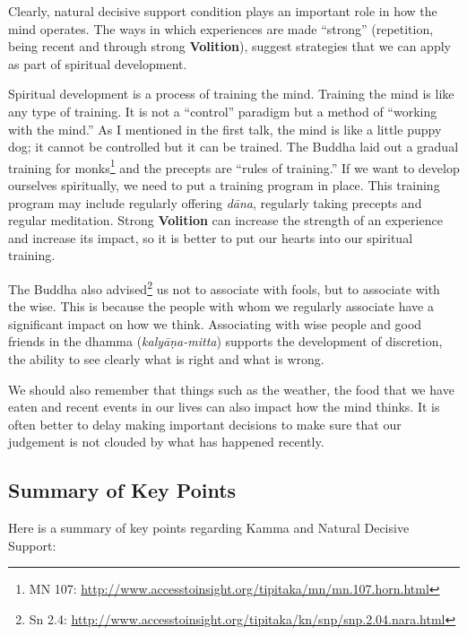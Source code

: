 Clearly, natural decisive support condition plays an important role in how the mind operates. The ways in which experiences are made “strong” (repetition, being recent and through strong \textbf{Volition}), suggest strategies that we can apply as part of spiritual development.

Spiritual development is a process of training the mind. Training the mind is like any type of training. It is not a “control” paradigm but a method of “working with the mind.” As I mentioned in the first talk, the mind is like a little puppy dog; it cannot be controlled but it can be trained. The Buddha laid out a gradual training for monks\footnote{MN 107: \url{http://www.accesstoinsight.org/tipitaka/mn/mn.107.horn.html}} and the precepts are “rules of training.” If we want to develop ourselves spiritually, we need to put a training program in place. This training program may include regularly offering \textit{dāna}, regularly taking precepts and regular meditation. Strong \textbf{Volition} can increase the strength of an experience and increase its impact, so it is better to put our hearts into our spiritual training.

The Buddha also advised\footnote{Sn 2.4: \url{http://www.accesstoinsight.org/tipitaka/kn/snp/snp.2.04.nara.html}} us not to associate with fools, but to associate with the wise. This is because the people with whom we regularly associate have a significant impact on how we think. Associating with wise people and good friends in the dhamma (\textit{kalyāṇa-mitta}) supports the development of discretion, the ability to see clearly what is right and what is wrong.

We should also remember that things such as the weather, the food that we have eaten and recent events in our lives can also impact how the mind thinks. It is often better to delay making important decisions to make sure that our judgement is not clouded by what has happened recently.

\subsection*{Summary of Key Points}

Here is a summary of key points regarding Kamma and Natural Decisive Support:

